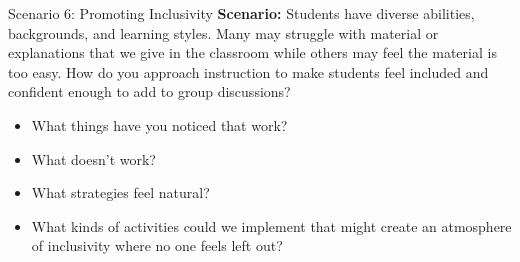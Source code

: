 \documentclass[dvipsnames]{beamer}
\begin{document}

\begin{frame}{Scenario 6: Promoting Inclusivity}
\textbf{Scenario:} Students have diverse abilities, backgrounds, and learning styles. Many may struggle with material or explanations that we give in the classroom while others may feel the material is too easy. How do you approach instruction to make students feel included and confident enough to add to group discussions?
\begin{itemize}
    \item What things have you noticed that work?
    \item What doesn’t work?
    \item What strategies feel natural?
    \item What kinds of activities could we implement that might create an atmosphere of inclusivity where no one feels left out?
\end{itemize}
\end{frame}
\end{document}
